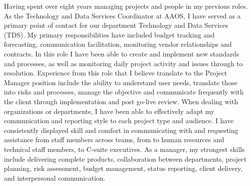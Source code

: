 \documentclass[9pt, a4paper]{awesome-cv}
\begin{document}
\makecvheader

\makelettertitle

\begin{cvletter}
Having spent over eight years managing projects and people in my previous roles. 
As the Technology and Data Services Coordinator at AAOS, I have served as a primary point of contact for our department Technology and Data Services (TDS). My primary responsibilities have included budget tracking and forecasting, communication facilitation, monitoring vendor relationships and contracts. In this role I have been able to create and implement new standards and processes, as well as monitoring daily project activity and issues through to resolution. Experience from this role that I believe translate to the Project Manager position include the ability to understand user needs, translate those into risks and processes, manage the objective and communicate frequently with the client through implementation and post go-live review. When dealing with organizations or departments, I have been able to effectively adapt my communication and reporting style to each project type and audience. I have consistently displayed skill and comfort in communicating with and requesting assistance from staff members across teams, from to human resources and technical staff members, to C-suite executives. As a manager, my strongest skills include delivering complete products, collaboration between departments,  project planning, risk assessment, budget management, status reporting, client delivery, and interpersonal communication.













\end{cvletter}
\end{document}
